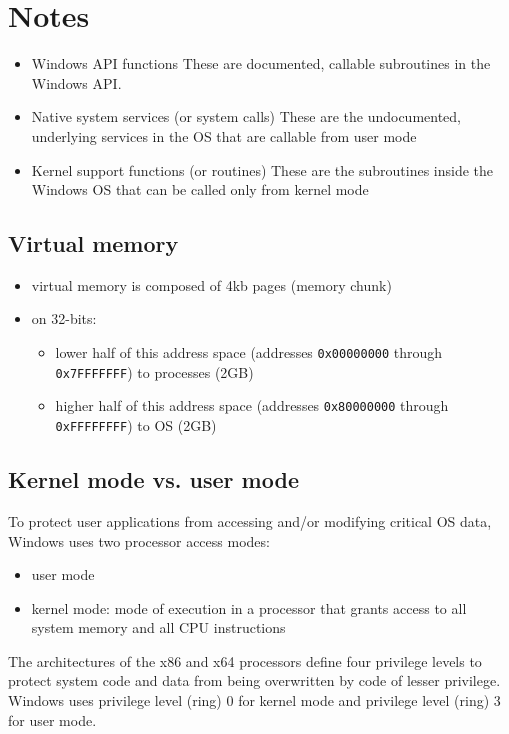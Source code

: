 \section{Notes}

\begin{itemize}
    \item Windows API functions These are documented, callable subroutines in the Windows API.
    \item Native system services (or system calls) These are the undocumented, underlying services in the OS that are callable from user mode
    \item Kernel support functions (or routines) These are the subroutines inside the Windows OS that can be called only from kernel mode
\end{itemize}

\subsection{Virtual memory}

\begin{itemize}
    \item virtual memory is composed of 4kb pages (memory chunk)
    \item on 32-bits:
        \begin{itemize}
            \item lower half of this address space (addresses \verb+0x00000000+ through \verb+0x7FFFFFFF+) to processes (2GB)
            \item higher half of this address space (addresses \verb+0x80000000+ through \verb+0xFFFFFFFF+) to OS (2GB)
        \end{itemize}
\end{itemize}

\subsection{Kernel mode vs. user mode}

To protect user applications from accessing and/or modifying critical OS data, Windows uses two
processor access modes:
\begin{itemize}
    \item user mode
    \item kernel mode: mode of execution in a processor that grants access to all system memory and all CPU instructions
\end{itemize}

The architectures of the x86 and x64 processors define four privilege levels to protect system code and data from being overwritten by code of lesser privilege. Windows uses privilege level (ring) 0 for kernel mode and privilege level (ring) 3 for user mode.


